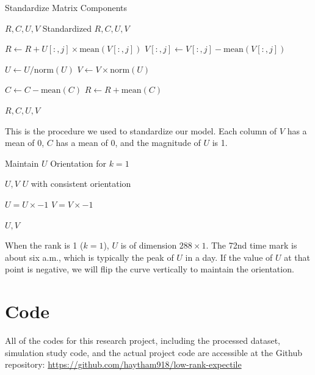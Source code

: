 \documentclass{article}
\begin{document}
\begin{algorithm}[H]
\caption{Standardize Matrix Components}
\begin{algorithmic}[1]
\Require $R, C, U, V$
\Ensure Standardized $R, C, U, V$

    \State $R \gets R + U[:, j] \times \text{mean}(V[:, j])$
    \State $V[:, j] \gets V[:, j] - \text{mean}(V[:, j])$
\EndFor

\State $U \gets U / \text{norm}(U)$
\State $V \gets V \times \text{norm}(U)$

\State $C \gets C - \text{mean}(C)$
\State $R \gets R + \text{mean}(C)$

\State \Return $R, C, U, V$
\end{algorithmic}
\end{algorithm}
This is the procedure we used to standardize our model. Each column of $V$ has a mean of 0, $C$ has a mean of 0, and the magnitude of $U$ is 1. 

\begin{algorithm}[H]
\caption{Maintain $U$ Orientation for $k = 1$}
\begin{algorithmic}[1]
\Require $U, V$
\Ensure $U$ with consistent orientation

    \State $U = U \times -1$
    \State $V = V \times -1$
\EndIf

\State \Return $U, V$
\end{algorithmic}
\end{algorithm}
When the rank is 1 ($k = 1$), $U$ is of dimension $288 \times 1$. The 72nd time mark is about six a.m., which is typically the peak of $U$ in a day. If the value of $U$ at that point is negative, we will flip the curve vertically to maintain the orientation. 

\section{Code} \label{appendix.c}
All of the codes for this research project, including the processed dataset, simulation study code, and the actual project code are accessible at the Github repository: \href{https://github.com/haytham918/low-rank-expectile}{https://github.com/haytham918/low-rank-expectile}
\end{document}
